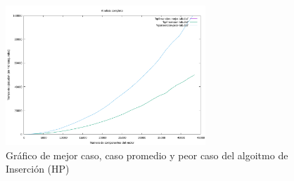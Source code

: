 \documentclass{homework}
\begin{document}
    \begin{figure}[H]
        \centering
        \label{hp:insercion-mp}
        \includegraphics[width=0.67\textwidth]{../data/hp-insercion-mp.pdf}
        \caption{Gráfico de mejor caso, caso promedio y peor caso del algoitmo de Inserción (HP)}
    \end{figure}
\end{document}
